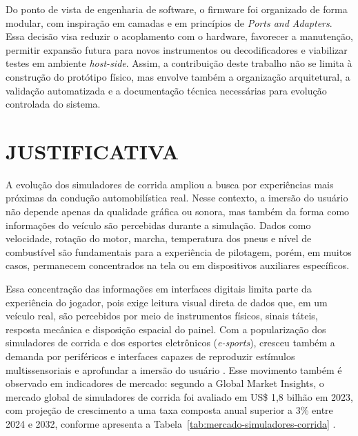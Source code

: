 \documentclass[
  12pt,
  oneside,
  a4paper,
  chapter=TITLE,
  section=TITLE,
  subsection=TITLE,
  brazil
]{abntex2}
\begin{document}
Do ponto de vista de engenharia de software, o firmware foi organizado de forma modular, com inspiração em camadas e em princípios de \textit{Ports and Adapters}. Essa decisão visa reduzir o acoplamento com o hardware, favorecer a manutenção, permitir expansão futura para novos instrumentos ou decodificadores e viabilizar testes em ambiente \textit{host-side}. Assim, a contribuição deste trabalho não se limita à construção do protótipo físico, mas envolve também a organização arquitetural, a validação automatizada e a documentação técnica necessárias para evolução controlada do sistema.

\section{JUSTIFICATIVA}

A evolução dos simuladores de corrida ampliou a busca por experiências mais próximas da condução automobilística real. Nesse contexto, a imersão do usuário não depende apenas da qualidade gráfica ou sonora, mas também da forma como informações do veículo são percebidas durante a simulação. Dados como velocidade, rotação do motor, marcha, temperatura dos pneus e nível de combustível são fundamentais para a experiência de pilotagem, porém, em muitos casos, permanecem concentrados na tela ou em dispositivos auxiliares específicos.

Essa concentração das informações em interfaces digitais limita parte da experiência do jogador, pois exige leitura visual direta de dados que, em um veículo real, são percebidos por meio de instrumentos físicos, sinais táteis, resposta mecânica e disposição espacial do painel. Com a popularização dos simuladores de corrida e dos esportes eletrônicos (\textit{e-sports}), cresceu também a demanda por periféricos e interfaces capazes de reproduzir estímulos multissensoriais e aprofundar a imersão do usuário \cite{calleo2023}. Esse movimento também é observado em indicadores de mercado: segundo a Global Market Insights, o mercado global de simuladores de corrida foi avaliado em US\$ 1,8 bilhão em 2023, com projeção de crescimento a uma taxa composta anual superior a 3\% entre 2024 e 2032, conforme apresenta a Tabela~\ref{tab:mercado-simuladores-corrida} \cite{gminsights2024}.
\end{document}
